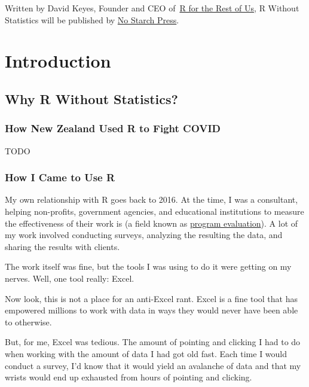 \documentclass[
]{book}
\begin{document}
Written by David Keyes, Founder and CEO of~\href{https://rfortherestofus.com/}{R for the Rest of Us}, R Without Statistics will be published by \href{https://nostarch.com/}{No Starch Press}.

\hypertarget{part-introduction}{%
\part*{Introduction}\label{part-introduction}}

\hypertarget{why-r-without-statistics}{%
\chapter*{Why R Without Statistics?}\label{why-r-without-statistics}}

\hypertarget{how-new-zealand-used-r-to-fight-covid}{%
\section*{How New Zealand Used R to Fight COVID}\label{how-new-zealand-used-r-to-fight-covid}}

TODO

\hypertarget{how-i-came-to-use-r}{%
\section*{How I Came to Use R}\label{how-i-came-to-use-r}}

My own relationship with R goes back to 2016. At the time, I was a consultant, helping non-profits, government agencies, and educational institutions to measure the effectiveness of their work is (a field known as \href{https://www.cdc.gov/evaluation/index.htm}{program evaluation}). A lot of my work involved conducting surveys, analyzing the resulting the data, and sharing the results with clients.

The work itself was fine, but the tools I was using to do it were getting on my nerves. Well, one tool really: Excel.

Now look, this is not a place for an anti-Excel rant. Excel is a fine tool that has empowered millions to work with data in ways they would never have been able to otherwise.

But, for me, Excel was tedious. The amount of pointing and clicking I had to do when working with the amount of data I had got old fast. Each time I would conduct a survey, I'd know that it would yield an avalanche of data and that my wrists would end up exhausted from hours of pointing and clicking.
\end{document}
